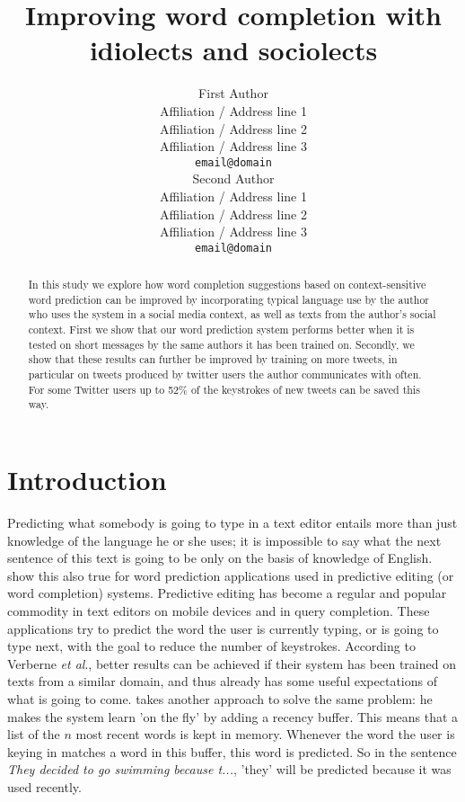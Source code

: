 \documentclass[11pt]{article}
\title{Improving word completion with idiolects and sociolects}
\author{First Author \\
  Affiliation / Address line 1 \\
  Affiliation / Address line 2 \\
  Affiliation / Address line 3 \\
  {\tt email@domain} \\\And
  Second Author \\
  Affiliation / Address line 1 \\
  Affiliation / Address line 2 \\
  Affiliation / Address line 3 \\
  {\tt email@domain} \\}
\date{}
\begin{document}
\maketitle

\begin{abstract} 
In this study we explore how word completion suggestions based on context-sensitive word prediction can be improved by incorporating typical language use by the author who uses the system in a social media context, as well as texts from the author's social context. First we show that our word prediction system performs better when it is tested on short messages by the same authors it has been trained on. Secondly, we show that these results can further be improved by training on more tweets, in particular on tweets produced by twitter users the author communicates with often. For some Twitter users up to 52\% of the keystrokes of new tweets can be saved this way.


\end{abstract}

\section{Introduction}
Predicting what somebody is going to type in a text editor entails more than just knowledge of the language he or she uses; it is impossible to say what the next sentence of this text is going to be only on the basis of knowledge of English.  show this also true for word prediction applications used in predictive editing (or word completion) systems. Predictive editing has become a regular and popular commodity in text editors on mobile devices and in query completion. These applications try to predict the word the user is currently typing, or is going to type next, with the goal to reduce the number of keystrokes. According to Verberne {\it et al}., better results can be achieved if their system has been trained on texts from a similar domain, and thus already has some useful expectations of what is going to come.  takes another approach to solve the same problem: he makes the system learn 'on the fly' by adding a recency buffer. This means that a list of the $n$ most recent words is kept in memory. Whenever the word the user is keying in matches a word in this buffer, this word is predicted. So in the sentence \emph{They decided to go swimming because t...}, 'they' will be predicted because it was used recently.
\end{document}
